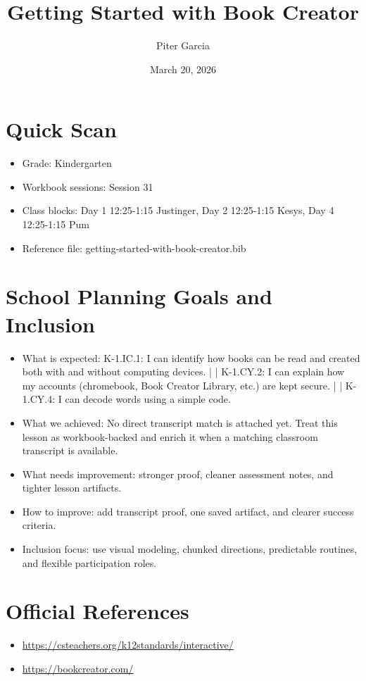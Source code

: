 \documentclass[11pt]{article}
\title{Getting Started with Book Creator}
\author{Piter Garcia}
\date{March 20, 2026}
\begin{document}
    \maketitle
    \section*{Quick Scan}
    \begin{itemize}[leftmargin=*]
    \item Grade: Kindergarten
    \item Workbook sessions: Session 31
    \item Class blocks: Day 1 12:25-1:15 Justinger, Day 2 12:25-1:15 Kesys, Day 4 12:25-1:15 Pum
    \item Reference file: getting-started-with-book-creator.bib
    \end{itemize}
    \section*{School Planning Goals and Inclusion}
    \begin{itemize}[leftmargin=*]
    \item What is expected: K-1.IC.1: I can identify how books can be read and created both with and without computing devices. | | K-1.CY.2: I can explain how my accounts (chromebook, Book Creator Library, etc.) are kept secure. | | K-1.CY.4: I can decode words using a simple code.
    \item What we achieved: No direct transcript match is attached yet. Treat this lesson as workbook-backed and enrich it when a matching classroom transcript is available.
    \item What needs improvement: stronger proof, cleaner assessment notes, and tighter lesson artifacts.
    \item How to improve: add transcript proof, one saved artifact, and clearer success criteria.
    \item Inclusion focus: use visual modeling, chunked directions, predictable routines, and flexible participation roles.
    \end{itemize}
    \section*{Official References}
    \begin{itemize}[leftmargin=*]
    \item \url{https://csteachers.org/k12standards/interactive/}
\item \url{https://bookcreator.com/}

    \end{itemize}
    
\end{document}
